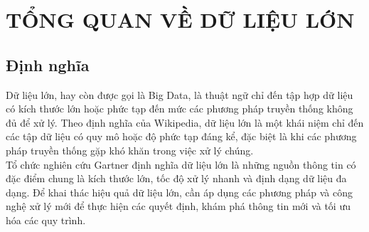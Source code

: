 \documentclass{report}
\begin{document}
\chapter[TỔNG QUAN VỀ DỮ LIỆU LỚN]
 {\LARGE TỔNG QUAN VỀ DỮ LIỆU LỚN}

\section{Định nghĩa}
\begin{flushleft}
    Dữ liệu lớn, hay còn được gọi là Big Data, là thuật ngữ chỉ đến tập hợp dữ
    liệu có kích thước lớn hoặc phức tạp đến mức các phương pháp truyền thống
    không đủ để xử lý. Theo định nghĩa của Wikipedia, dữ liệu lớn là một khái
    niệm chỉ đến các tập dữ liệu có quy mô hoặc độ phức tạp đáng kể, đặc biệt
    là khi các phương pháp truyền thống gặp khó khăn trong việc xử lý chúng.\\
    \vspace{0.5cm}
    Tổ chức nghiên cứu Gartner định nghĩa dữ liệu lớn là những nguồn thông tin
    có đặc điểm chung là kích thước lớn, tốc độ xử lý nhanh và định dạng dữ liệu
    đa dạng. Để khai thác hiệu quả dữ liệu lớn, cần áp dụng các phương pháp và
    công nghệ xử lý mới để thực hiện các quyết định, khám phá thông tin mới và
    tối ưu hóa các quy trình.
\end{flushleft}

\end{document}

